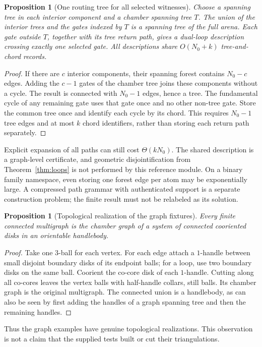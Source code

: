 \documentclass[11pt]{article}
\newtheorem{proposition}[theorem]{Proposition}
\theoremstyle{definition}
\begin{document}
\begin{proposition}[One routing tree for all selected witnesses]\label{prop:routing}
Choose a spanning tree in each interior component and a chamber spanning tree $T$. The union of the interior trees and the gates indexed by $T$ is a spanning tree of the full arena. Each gate outside $T$, together with its tree return path, gives a dual-loop description crossing exactly one selected gate. All descriptions share $O(N_0+k)$ tree-and-chord records.
\end{proposition}
\begin{proof}
If there are $c$ interior components, their spanning forest contains $N_0-c$ edges. Adding the $c-1$ gates of the chamber tree joins these components without a cycle. The result is connected with $N_0-1$ edges, hence a tree. The fundamental cycle of any remaining gate uses that gate once and no other non-tree gate. Store the common tree once and identify each cycle by its chord. This requires $N_0-1$ tree edges and at most $k$ chord identifiers, rather than storing each return path separately.
\end{proof}
Explicit expansion of all paths can still cost $\Theta(kN_0)$. The shared description is a graph-level certificate, and geometric disjointification from Theorem~\ref{thm:loops} is not performed by this reference module. On a binary family namespace, even storing one forest edge per atom may be exponentially large. A compressed path grammar with authenticated support is a separate construction problem; the finite result must not be relabeled as its solution.

\begin{proposition}[Topological realization of the graph fixtures]\label{prop:realization}
Every finite connected multigraph is the chamber graph of a system of connected cooriented disks in an orientable handlebody.
\end{proposition}
\begin{proof}
Take one $3$-ball for each vertex. For each edge attach a $1$-handle between small disjoint boundary disks of its endpoint balls; for a loop, use two boundary disks on the same ball. Coorient the co-core disk of each $1$-handle. Cutting along all co-cores leaves the vertex balls with half-handle collars, still balls. Its chamber graph is the original multigraph. The connected union is a handlebody, as can also be seen by first adding the handles of a graph spanning tree and then the remaining handles.
\end{proof}
Thus the graph examples have genuine topological realizations. This observation is not a claim that the supplied tests built or cut their triangulations.
\end{document}
